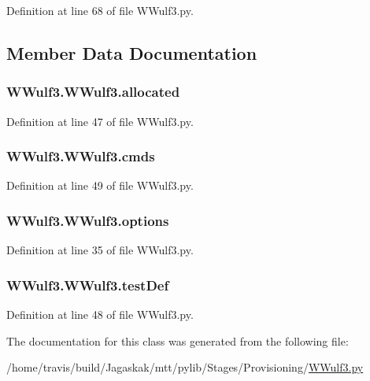 Definition at line 68 of file W\-Wulf3.\-py.



\subsection{Member Data Documentation}
\hypertarget{classWWulf3_1_1WWulf3_ad83bab03cfcdab3a5b689a0958db19e8}{
\subsubsection[{allocated}]{\setlength{\rightskip}{0pt plus 5cm}W\-Wulf3.\-W\-Wulf3.\-allocated}}\label{classWWulf3_1_1WWulf3_ad83bab03cfcdab3a5b689a0958db19e8}


Definition at line 47 of file W\-Wulf3.\-py.

\hypertarget{classWWulf3_1_1WWulf3_afb4fb9db2456e29872155d9b8738418f}{
\subsubsection[{cmds}]{\setlength{\rightskip}{0pt plus 5cm}W\-Wulf3.\-W\-Wulf3.\-cmds}}\label{classWWulf3_1_1WWulf3_afb4fb9db2456e29872155d9b8738418f}


Definition at line 49 of file W\-Wulf3.\-py.

\hypertarget{classWWulf3_1_1WWulf3_adff5ffd43f8b68d49c7b45ab48d7b428}{
\subsubsection[{options}]{\setlength{\rightskip}{0pt plus 5cm}W\-Wulf3.\-W\-Wulf3.\-options}}\label{classWWulf3_1_1WWulf3_adff5ffd43f8b68d49c7b45ab48d7b428}


Definition at line 35 of file W\-Wulf3.\-py.

\hypertarget{classWWulf3_1_1WWulf3_a9e8732432df9211bd64454c4c0e04098}{
\subsubsection[{test\-Def}]{\setlength{\rightskip}{0pt plus 5cm}W\-Wulf3.\-W\-Wulf3.\-test\-Def}}\label{classWWulf3_1_1WWulf3_a9e8732432df9211bd64454c4c0e04098}


Definition at line 48 of file W\-Wulf3.\-py.



The documentation for this class was generated from the following file\-:\begin{DoxyCompactItemize}
\item 
/home/travis/build/\-Jagaskak/mtt/pylib/\-Stages/\-Provisioning/\hyperlink{WWulf3_8py}{W\-Wulf3.\-py}\end{DoxyCompactItemize}

